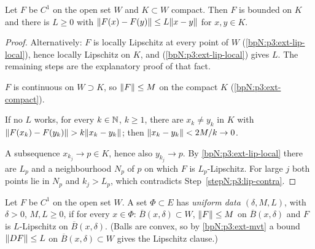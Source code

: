 \begin{lemma}\label{bpN:p3:gen-lip}
Let $F$ be $C^1$ on the open set $W$ and $K\subset W$ compact. Then $F$ is bounded on $K$ and there is $L\ge0$ with
$\lVert F(x)-F(y)\rVert\le L\lVert x-y\rVert$ for $x,y\in K$.
\end{lemma}
\begin{proof}
\label{stepN:p3:lip-mathlib} Alternatively: $F$ is locally Lipschitz at every point of $W$ (\ref{bpN:p3:ext-lip-local}), hence locally Lipschitz on $K$, and  (\ref{bpN:p3:ext-lip-local}) gives $L$. The remaining steps are the explanatory proof of that fact.

\label{stepN:p3:lip-bdd} $F$ is continuous on $W\supset K$, so $\lVert F\rVert\le M$ on the compact $K$ (\ref{bpN:p3:ext-compact}).

\label{stepN:p3:lip-contra}
If no $L$ works, for every $k\in\mathbb{N}$, $k\ge1$, there are $x_k\ne y_k$ in $K$ with $\lVert F(x_k)-F(y_k)\rVert>k\lVert x_k-y_k\rVert$; then
$\lVert x_k-y_k\rVert<2M/k\to0$.

\label{stepN:p3:lip-compact}
A subsequence $x_{k_j}\to p\in K$, hence also $y_{k_j}\to p$. By \ref{bpN:p3:ext-lip-local} there are $L_p$ and a
neighbourhood $N_p$ of $p$ on which $F$ is $L_p$-Lipschitz. For large $j$ both points lie in $N_p$ and $k_j>L_p$, which
contradicts Step~\ref{stepN:p3:lip-contra}.
\end{proof}

\begin{definition}\label{bpN:p3:gen-uniform}
Let $F$ be $C^1$ on the open set $W$. A set $\Phi\subset E$ has \emph{uniform data $(\delta,M,L)$}, with $\delta>0$,
$M,L\ge0$, if for every $x\in\Phi$: $\overline B(x,\delta)\subset W$, $\lVert F\rVert\le M$ on $\overline B(x,\delta)$ and
$F$ is $L$-Lipschitz on $\overline B(x,\delta)$. (Balls are convex, so by \ref{bpN:p3:ext-mvt} a bound
$\lVert DF\rVert\le L$ on $\overline B(x,\delta)\subset W$ gives the Lipschitz clause.)
\end{definition}

